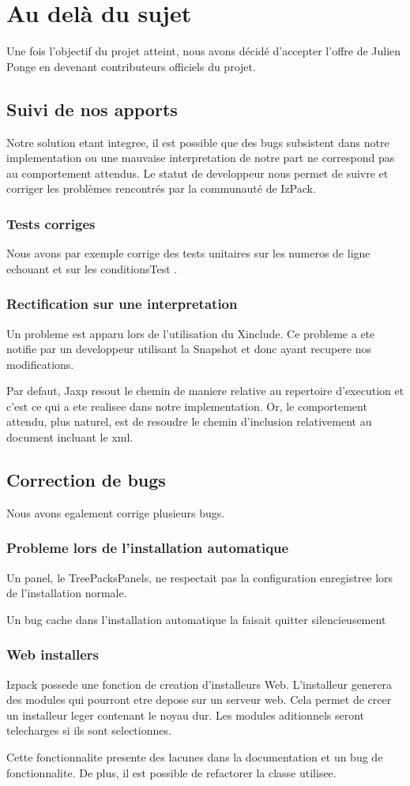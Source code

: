 \section{Au delà du sujet}
Une fois l'objectif du projet atteint, nous avons décidé d'accepter l'offre de Julien Ponge en devenant contributeurs officiels du projet.
\subsection{Suivi de nos apports}
Notre solution etant integree, il est possible que des bugs subsistent dans notre implementation ou une mauvaise interpretation de notre part ne correspond pas au comportement attendus. Le statut de developpeur nous permet de suivre et corriger les problèmes rencontrés par la communauté de IzPack.
\subsubsection{Tests corriges}
Nous avons par exemple corrige des tests unitaires sur les numeros de ligne echouant \cite{IZPACK-306} et sur les conditionsTest \cite{IZPACK-305}.
\subsubsection{Rectification sur une interpretation}
Un probleme est apparu lors de l'utilisation du Xinclude\cite{IZPACK-303}. Ce probleme a ete notifie par un developpeur utilisant la Snapshot et donc ayant recupere nos modifications.

Par defaut, Jaxp resout le chemin de maniere relative au repertoire d'execution et c'est ce qui a ete realisee dans notre implementation. Or, le comportement attendu, plus naturel, est de resoudre le chemin d'inclusion relativement au document incluant le xml.
\subsection{Correction de bugs}
Nous avons egalement corrige plusieurs bugs.
\subsubsection{Probleme lors de l'installation automatique}
Un panel, le TreePacksPanels, ne respectait pas la configuration enregistree lors de l'installation normale.\cite{IZPACK-223}

Un bug cache dans l'installation automatique la faisait quitter silencieusement \cite{IZPACK-309}
\subsubsection{Web installers}
Izpack possede une fonction de creation d'installeurs Web. L'installeur generera des modules qui pourront etre depose sur un serveur web. Cela permet de creer un installeur leger contenant le noyau dur. Les modules aditionnels seront telecharges si ils sont selectionnes.

Cette fonctionnalite presente des lacunes dans la documentation \cite{IZPACK-224} et un bug de fonctionnalite\cite{IZPACK-281}. De plus, il est possible de refactorer la classe utilisee\cite{IZPACK-307}.
